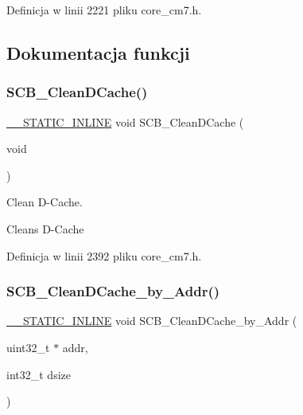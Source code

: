 Definicja w linii 2221 pliku core\+\_\+cm7.\+h.



\subsection{Dokumentacja funkcji}
\mbox{\label{group___c_m_s_i_s___core___cache_functions_ga55583e3065c6eabca204b8b89b121c4c}} 
\subsubsection{\texorpdfstring{S\+C\+B\+\_\+\+Clean\+D\+Cache()}{SCB\_CleanDCache()}}
{\footnotesize\ttfamily \hyperlink{cmsis__iccarm_8h_aba87361bfad2ae52cfe2f40c1a1dbf9c}{\+\_\+\+\_\+\+S\+T\+A\+T\+I\+C\+\_\+\+I\+N\+L\+I\+NE} void S\+C\+B\+\_\+\+Clean\+D\+Cache (\begin{DoxyParamCaption}\item[{void}]{ }\end{DoxyParamCaption})}



Clean D-\/\+Cache. 

Cleans D-\/\+Cache 

Definicja w linii 2392 pliku core\+\_\+cm7.\+h.

\mbox{\label{group___c_m_s_i_s___core___cache_functions_ga696fadbf7b9cc71dad42fab61873a40d}} 
\subsubsection{\texorpdfstring{S\+C\+B\+\_\+\+Clean\+D\+Cache\+\_\+by\+\_\+\+Addr()}{SCB\_CleanDCache\_by\_Addr()}}
{\footnotesize\ttfamily \hyperlink{cmsis__iccarm_8h_aba87361bfad2ae52cfe2f40c1a1dbf9c}{\+\_\+\+\_\+\+S\+T\+A\+T\+I\+C\+\_\+\+I\+N\+L\+I\+NE} void S\+C\+B\+\_\+\+Clean\+D\+Cache\+\_\+by\+\_\+\+Addr (\begin{DoxyParamCaption}\item[{uint32\+\_\+t $\ast$}]{addr,  }\item[{int32\+\_\+t}]{dsize }\end{DoxyParamCaption})}



